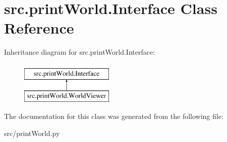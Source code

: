 \hypertarget{classsrc_1_1print_world_1_1_interface}{\section{src.\-print\-World.\-Interface \-Class \-Reference}
\label{classsrc_1_1print_world_1_1_interface}
}
\-Inheritance diagram for src.\-print\-World.\-Interface\-:\begin{figure}[H]
\begin{center}
\leavevmode
\includegraphics[height=2.000000cm]{classsrc_1_1print_world_1_1_interface}
\end{center}
\end{figure}


\-The documentation for this class was generated from the following file\-:\begin{DoxyCompactItemize}
\item 
src/print\-World.\-py\end{DoxyCompactItemize}
